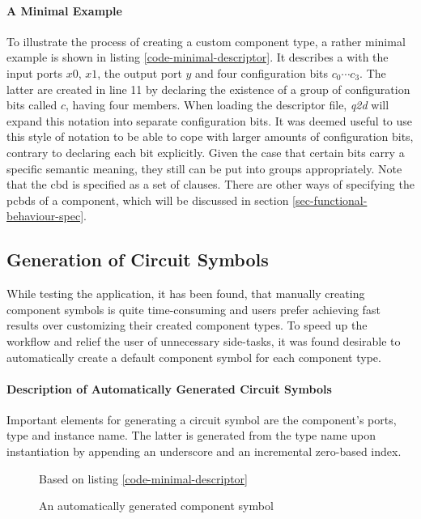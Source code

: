 	\paragraph{A Minimal Example}
		To illustrate the process of	creating a custom component type, a rather minimal example is shown in listing \ref{code-minimal-descriptor}.
		It describes a  with the input ports $x0$, $x1$, the output port $y$ and four configuration bits $c_0 \cdots c_3$.
		The latter are created in line 11 by declaring the existence of a group of configuration bits called $c$, having four members.
		When loading the descriptor file, \emph{q2d} will expand this notation into separate configuration bits.
		It was deemed useful to use this style of notation to be able to cope with larger amounts of configuration bits, contrary to declaring each bit explicitly.
		Given the case that certain bits carry a specific semantic meaning, they still can be put into groups appropriately.
		Note that the \gls{cbd} is specified as a set of clauses.
		There are other ways of specifying the \glspl{pcbd} of a component, which will be discussed in section \ref{sec-functional-behaviour-spec}.


\subsection{Generation of Circuit Symbols}
	\label{sec-symbol-generation}
	
	While testing the application, it has been found, that manually creating component symbols is quite time-consuming and users prefer achieving fast results over customizing their created component types.
	To speed up the workflow and relief the user of unnecessary side-tasks, it was found desirable to automatically create a default component symbol for each component type.
	
	\paragraph{Description of Automatically Generated Circuit Symbols}
	Important elements for generating a circuit symbol are the component's ports, type and instance name.
	The latter is generated from the type name upon instantiation by appending an underscore and an incremental zero-based index.
	
	\begin{figure}
		\centering
		 
		\caption{An automatically generated component symbol}
		Based on listing \ref{code-minimal-descriptor}
		\label{fig-generated-symbol}
	\end{figure}
	
